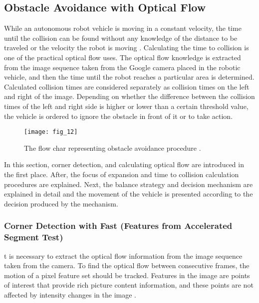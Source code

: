 \documentclass[twocolumn, switch]{article} %
\begin{document}
\subsection{Obstacle Avoidance with Optical Flow}

While an autonomous robot vehicle is moving in a constant
velocity, the time until the collision can be found without any
knowledge of the distance to be traveled or the velocity the
robot is moving \cite{o2005optical}. Calculating the time to collision is one
of the practical optical flow uses. The optical flow
knowledge is extracted from the image sequence taken from
the Google camera placed in the robotic vehicle, and then the
time until the robot reaches a particular area is determined.
Calculated collision times are considered separately as
collision times on the left and right of the image. Depending
on whether the difference between the collision times of the
left and right side is higher or lower than a certain threshold
value, the vehicle is ordered to ignore the obstacle in front of
it or to take action.

\break

\begin{figure}[h]
    \centering
    \texttt{[image: fig\_12]}
    \caption{The flow char representing obstacle avoidance
procedure \cite{souhila2007optical}.}
    \label{fig:fig12}
\end{figure}

In this section, corner detection, and calculating optical flow
are introduced in the first place. After, the focus of expansion
and time to collision calculation procedures are explained.
Next, the balance strategy and decision mechanism are
explained in detail and the movement of the vehicle is
presented according to the decision produced by the
mechanism.

\subsubsection{Corner Detection with Fast (Features from Accelerated Segment Test)}

t is necessary to extract the optical flow information from
the image sequence taken from the camera. To find the
optical flow between consecutive frames, the motion of a
pixel feature set should be tracked. Features in the image are
points of interest that provide rich picture content
information, and these points are not affected by intensity
changes in the image \cite{fleet2006optical}.
\end{document}
